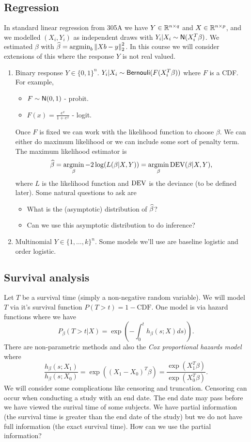 \subsection{Regression}
In standard linear regression from 305A we have $Y \in {\mathbb R}^{n \times q}$ and $X \in {\mathbb R}^{n \times p}$, and we modelled $(X_i,Y_i)$ as independent draws with $Y_i |X_i \sim \mathsf{N}(X_i^T\beta)$. We estimated $\beta$ with $\widehat{\beta} = \operatorname*{argmin}_b \left\|Xb-y\right\|_2^2$. In this course we will consider extensions of this  where the response $Y$ is not real valued.
\begin{enumerate}
    \item Binary response $Y \in \{0,1\}^n$. $Y_i|X_i \sim \mathsf{Bernouli}(F(X_i^T\beta))$ where $F$ is a CDF. For example,
    \begin{itemize}
        \item $F \sim \mathsf{N}(0,1)$ - probit.
        \item $F(x) = \frac{e^x}{1+e^x}$ - logit.
    \end{itemize}
    Once $F$ is fixed we can work with the likelihood function to choose $\beta$. We can either do maximum likelihood or we can include some sort of penalty term. The maximum likelihood estimator is
    \[\widehat{\beta} = \operatorname*{argmin}_\beta -2\log(L(\beta|X,Y)) = \operatorname*{argmin}_\beta \operatorname{DEV}(\beta | X,Y), \]
    where $L$ is the likelihood function and $\operatorname{DEV}$ is the deviance (to be defined later). Some natural questions to ask are
    \begin{itemize}
        \item What is the (asymptotic) distribution of $\widehat{\beta}$?
        \item Can we  use this asymptotic distribution to do inference?
    \end{itemize}
    \item Multinomial $Y \in \{1,\ldots, k\}^n$. Some models we'll use are baseline logistic and order logistic.
\end{enumerate}
\subsection{Survival analysis}
Let $T$ be a survival time (simply a non-negative random variable). We will model $T$ via it's survival function $P(T > t) = 1-\text{CDF}$. One model is via hazard functions where we have
\[P_\beta(T > t |X) = \exp\left(-\int_0^t h_\beta(s;X)ds)\right). \]
There are non-parametric methods and also the \emph{Cox proportional hazards model} where
\[\frac{h_\beta(s;X_1)}{h_\beta(s;X_0)} = \exp\left((X_1-X_0)^T\beta\right) = \frac{\exp(X_1^T\beta)}{\exp(X_0^T\beta)}. \]
We will consider some complications like censoring and truncation. Censoring can occur when conducting a study with an end date. The end date may pass before we have viewed the surival time of some subjects. We have partial information (the survival time is greater than the end date of the study) but we do not have full information (the exact survival time). How can we use the partial information?
